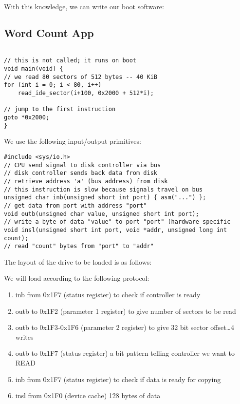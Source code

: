 \documentclass[../../lecture_notes.tex]{subfiles}
\begin{document}
With this knowledge, we can write our boot software:
\subsection*{Word Count App}
\begin{lstlisting}

// this is not called; it runs on boot
void main(void) {
// we read 80 sectors of 512 bytes -- 40 KiB
for (int i = 0; i < 80, i++)
	read_ide_sector(i+100, 0x2000 + 512*i);

// jump to the first instruction
goto *0x2000;
}
\end{lstlisting}

We use the following input/output primitives:
\begin{lstlisting}
#include <sys/io.h>
// CPU send signal to disk controller via bus
// disk controller sends back data from disk
// retrieve address 'a' (bus address) from disk
// this instruction is slow because signals travel on bus
unsigned char inb(unsigned short int port) { asm("...") };
// get data from port with address "port"
void outb(unsigned char value, unsigned short int port);
// write a byte of data "value" to port "port" (hardware specific
void insl(unsigned short int port, void *addr, unsigned long int count);
// read "count" bytes from "port" to "addr"
\end{lstlisting}


The layout of the drive to be loaded is as follows:



We will load according to the following protocol: \begin{enumerate}[nosep]
	\item inb from 0x1F7 (status register) to check if controller is ready
	\item outb to 0x1F2 (parameter 1 register) to give number of sectors to be read
	\item outb to 0x1F3-0x1F6 (parameter 2 register) to give 32 bit sector offset…4 writes
	\item outb to 0x1F7 (status register) a bit pattern telling controller we want to READ
	\item inb from 0x1F7 (status register) to check if data is ready for copying
	\item insl from 0x1F0 (device cache) 128 bytes of data
\end{enumerate}
\end{document}
